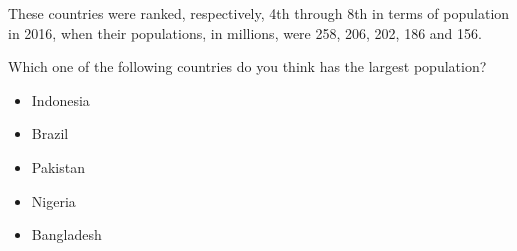 
These countries were ranked, respectively, 4th through 8th in terms of population in 2016, when
their populations, in millions, were 258, 206, 202, 186 and 156.

\begin{tcolorbox}
Which one of the following countries do you think has the largest population?

\begin{itemize}
	\setlength\itemsep{-5pt}
	\item Indonesia
	\item Brazil
	\item Pakistan
	\item Nigeria
	\item Bangladesh
\end{itemize}
\end{tcolorbox}
